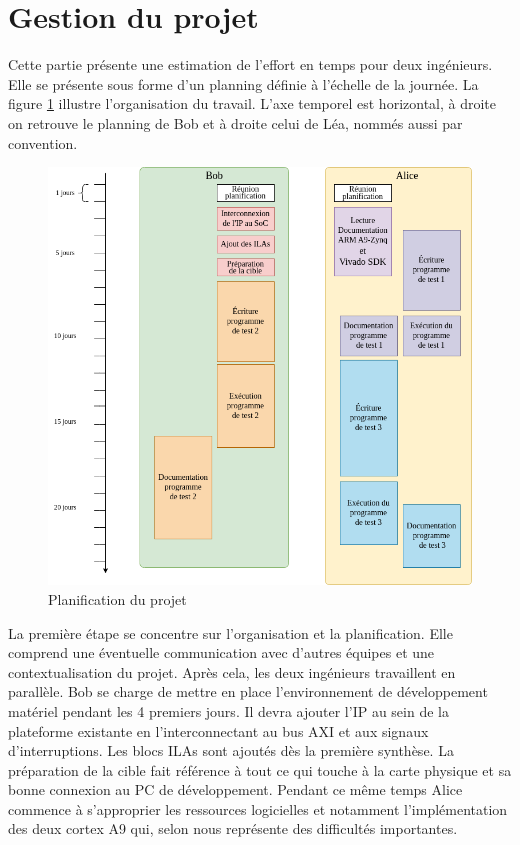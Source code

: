 \section{Gestion du projet}

Cette partie présente une estimation de l'effort en temps pour deux ingénieurs.
Elle se présente sous forme d'un planning définie à l'échelle de la journée.
La figure \ref{fig:planification} illustre l'organisation du travail.
L'axe temporel est horizontal, à droite on retrouve le planning de Bob et à droite celui de Léa, nommés aussi par convention.

\begin{figure}[H]
	\centering
	\includegraphics[width=0.75\linewidth]{figure/planning_integration.png}
	\caption{Planification du projet}
	\label{fig:planification}
\end{figure}
La première étape se concentre sur l'organisation et la planification.
Elle comprend une éventuelle communication avec d'autres équipes et une contextualisation du projet.
Après cela, les deux ingénieurs travaillent en parallèle.
Bob se charge de mettre en place l'environnement de développement matériel pendant les 4 premiers jours.
Il devra ajouter l'IP au sein de la plateforme existante en l'interconnectant au bus AXI et aux signaux d'interruptions.
Les blocs ILAs sont ajoutés dès la première synthèse.
La préparation de la cible fait référence à tout ce qui touche à la carte physique et sa bonne connexion au PC de développement.
Pendant ce même temps Alice commence à s'approprier les ressources logicielles et notamment l'implémentation des deux cortex A9 qui, selon nous représente des difficultés importantes.
